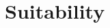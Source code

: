 \documentclass[a4paper,10pt]{article}
\begin{document}



\section{Suitability}  



\nocite{balcanefficient}




\end{document}

